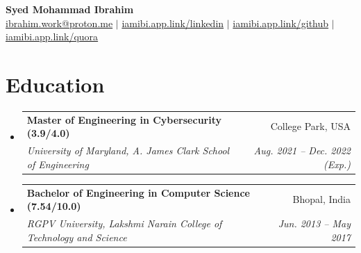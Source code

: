 \documentclass[letterpaper,11pt]{article}
\makeatletter
\newcommand{\resumeSubheading}[4]{
  \vspace{-2pt}\item
    \begin{tabular*}{0.97\textwidth}[t]{l@{\extracolsep{\fill}}r}
      \textbf{#1} & #2 \\
      \textit{\small#3} & \textit{\small #4} \\
    \end{tabular*}\vspace{-7pt}
}
\newcommand{\resumeSubHeadingListStart}{\begin{itemize}[leftmargin=0.15in, label={}]}
\newcommand{\resumeSubHeadingListEnd}{\end{itemize}}
\makeatother
\begin{document}

\begin{center}
    \textbf{\Huge{Syed Mohammad Ibrahim}} \\ \vspace{1pt}
    \href{mailto:ibrahim.work@proton.me}{ibrahim.work@proton.me} $|$
    \href{https://iamibi.app.link/linkedin}{iamibi.app.link/linkedin} $|$
    \href{https://iamibi.app.link/github}{iamibi.app.link/github} $|$
    \href{https://iamibi.app.link/quora}{iamibi.app.link/quora}
\end{center}

\section{Education}
  \resumeSubHeadingListStart
    \resumeSubheading
      {Master of Engineering in Cybersecurity (3.9/4.0)}{College Park, USA}
      {University of Maryland, A. James Clark School of Engineering}{Aug. 2021 -- Dec. 2022 (Exp.)}
    \resumeSubheading
      {Bachelor of Engineering in Computer Science (7.54/10.0)}{Bhopal, India}
      {RGPV University, Lakshmi Narain College of Technology and Science}{Jun. 2013 -- May 2017}
  \resumeSubHeadingListEnd
\end{document}
